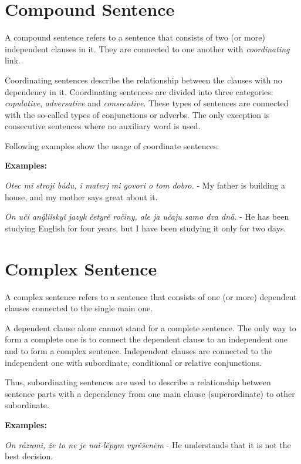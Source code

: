 \section{Compound Sentence}

A compound sentence refers to a sentence that consists of two (or more) independent clauses in it. They are connected to one another with \textit{coordinating} link.

Coordinating sentences describe the relationship between the clauses with no dependency in it. Coordinating sentences are divided into three categories: \textit{copulative}, \textit{adversative} and \textit{consecutive}. These types of sentences are connected with the so-called types of conjunctions or adverbs. The only exception is consecutive sentences where no auxiliary word is used.
 
Following examples show the usage of coordinate sentences:

\textbf{Examples:}

\textit{Otec mi stroji búdu, i materj mi govori o tom dobro.} - My father is building a house, and my mother says great about it.

\textit{On uči anĝliǐskyǐ jazyk četyrě ročiny, ale ja učaju samo dva dnä.} - He has been studying English for four years, but I have been studying it only for two days.

\section{Complex Sentence}

A complex sentence refers to a sentence that consists of one (or more) dependent clauses connected to the single main one.

A dependent clause alone cannot stand for a complete sentence. The only way to form a complete one is to connect the dependent clause to an independent one and to form a complex sentence. Independent clauses are connected to the independent one with subordinate, conditional or relative conjunctions.

Thus, subordinating sentences are used to describe a relationship between sentence parts with a dependency from one main clause (superordinate) to other subordinate.

\textbf{Examples:}

\textit{On råzumi, že to ne je naǐ-lěpym vyrěšenëm} - He understands that it is not the best decision.

